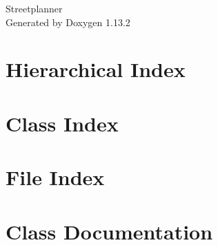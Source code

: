 \documentclass[twoside]{book}
\newcommand{\+}{\discretionary{\mbox{\scriptsize$\hookleftarrow$}}{}{}}
\newcommand{\clearemptydoublepage}{%
    \newpage{\pagestyle{empty}\cleardoublepage}%
  }
\begin{document}
  \raggedbottom
    \hypersetup{pageanchor=false,
                bookmarksnumbered=true,
                pdfencoding=unicode
               }
  \begin{titlepage}
  \vspace*{7cm}
  \begin{center}%
  {\Large Streetplanner}\\
  \vspace*{1cm}
  {\large Generated by Doxygen 1.13.2}\\
  \end{center}
  \end{titlepage}
  \clearemptydoublepage
  \tableofcontents
  \clearemptydoublepage
  \hypersetup{pageanchor=true}
\chapter{Hierarchical Index}

\chapter{Class Index}

\chapter{File Index}

\chapter{Class Documentation}






















\end{document}
